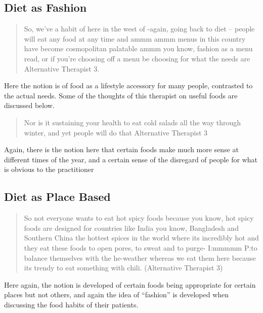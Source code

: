 \subsection{Diet as Fashion}
\label{sec:diet-as-fashion}

\begin{quotation}
  So, we've a habit of here in the west of -again, going back to diet – people will eat any food at any time and ammm ammm menus in this country have become cosmopolitan palatable ammm you know, fashion as a menu read, or if you're choosing off  a menu be choosing for what the needs are
Alternative Therapist 3. 
\end{quotation}

Here the notion is of food as a lifestyle accessory for many people, contrasted to the actual needs. Some of the thoughts of this therapist on useful foods are discussed below. 

\begin{quotation}
  Nor is it sustaining your health to eat cold salads all the way through winter, and yet people will do that
Alternative Therapist 3
\end{quotation}

Again, there is the notion here that certain foods make much more sense at different times of the year, and a certain sense of the disregard of people for what is obvious to the practitioner 



\subsection{Diet as Place Based}
\label{sec:diet-as-place}

\begin{quotation}
  So not everyone wants to eat hot spicy foods because you know, hot spicy foods are designed for countries like India you know, Bangladesh and Southern China the hottest spices in the world where its incredibly hot and they eat these foods to open pores, to sweat and to purge-
I:mmmmm
P:to balance themselves with the he-weather whereas we eat them here because its trendy to eat something with chili.
(Alternative Therapist 3)
\end{quotation}

Here again, the notion is developed of certain foods being appropriate for certain places but not others, and again the idea of ``fashion'' is developed when discussing the food habits of their patients. 

